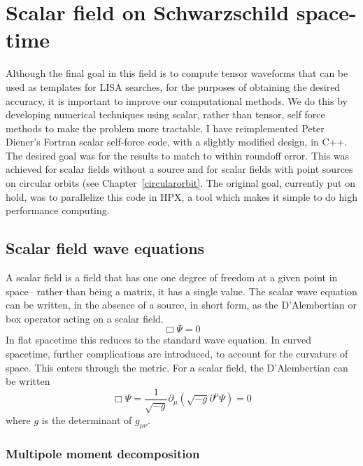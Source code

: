 \section{Scalar field on Schwarzschild space-time}
Although the final goal in this field is to compute tensor waveforms that can be used as templates for LISA searches, for the purposes of obtaining the desired accuracy, it is important to improve our computational methods. We do this by developing numerical techniques using scalar, rather than tensor, self force methods to make the problem more tractable. I have reimplemented Peter Diener's Fortran scalar self-force code, with a slightly modified design, in C++. The desired goal was for the results to match to within roundoff error. This was achieved for scalar fields without a source and for scalar fields with point sources on circular orbits (see Chapter~\ref{circularorbit}. The original goal, currently put on hold, was to parallelize this code in HPX, a tool which makes it simple to do high performance computing. 


\subsection{Scalar field wave equations}
A scalar field is a field that has one one degree of freedom at a given point in space-- rather than being a matrix, it has a single value. The scalar wave equation can be written, in the absence of a source, in short form, as the D'Alembertian or box operator acting on a scalar field. 
\begin{equation}
  \Box\Psi=0
\end{equation}
In flat spacetime this reduces to the standard wave equation. In curved spacetime, further complications are introduced, to account for the curvature of space. This enters through the metric. For a scalar field, the D'Alembertian can be written
\begin{equation}
  \Box\Psi=\frac{1}{\sqrt{-g}}\partial_\mu(\sqrt{-g}\partial^\mu\Psi)=0
\end{equation}
where $g$ is the determinant of $g_{\mu\nu}$.~\cite{Wald} 

\subsubsection{Multipole moment decomposition}

